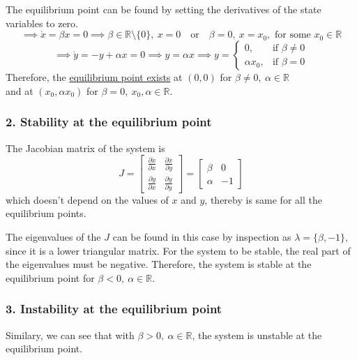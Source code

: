 The equilibrium point can be found by setting the derivatives of the state variables to zero.
\[
    \implies
    \dot{x} = \beta x = 0
    \implies
    \beta \in \mathbb{R}\setminus \{0\}, \ x = 0
    \quad \text{or} \quad
    \beta = 0, \ x = x_0, \text{ for some } x_0 \in \mathbb{R}
\]
\[
    \implies
    \dot{y} = -y + \alpha x = 0
    \implies
    y = \alpha x
    \implies
    y = \begin{cases}
        0,          & \text{if } \beta \neq 0 \\
        \alpha x_0, & \text{if } \beta = 0
    \end{cases}
\]
Therefore, the \underline{equilibrium point exists} at \( \boxed{ (0, 0) } \) for \( \beta \neq 0, \ \alpha \in \mathbb{R} \) \\
and at \( \boxed{ (x_0, \alpha x_0) } \) for \( \beta = 0, \ x_0, \alpha \in \mathbb{R} \).

\vspace*{-1em}
\subsubsection*{2. Stability at the equilibrium point}

The Jacobian matrix of the system is
\[
    J = \begin{bmatrix}
        \frac{\partial \dot{x}}{\partial x} & \frac{\partial \dot{x}}{\partial y} \\
        \frac{\partial \dot{y}}{\partial x} & \frac{\partial \dot{y}}{\partial y}
    \end{bmatrix}
    = \begin{bmatrix}
        \beta  & 0  \\
        \alpha & -1
    \end{bmatrix}
\]
which doesn't depend on the values of \( x \) and \( y \), thereby is same for all the equilibrium points.

The eigenvalues of the \( J \) can be found in this case by inspection as \( \lambda = \{ \beta, -1 \} \), since it is a lower triangular matrix.
For the system to be stable, the real part of the eigenvalues must be negative.
Therefore, the system is stable at the equilibrium point for \( \boxed{ \beta < 0, \ \alpha \in \mathbb{R} } \).

\vspace*{-1em}
\subsubsection*{3. Instability at the equilibrium point}

Similary, we can see that with \( \boxed{\beta > 0, \ \alpha \in \mathbb{R}} \), the system is unstable at the equilibrium point.
